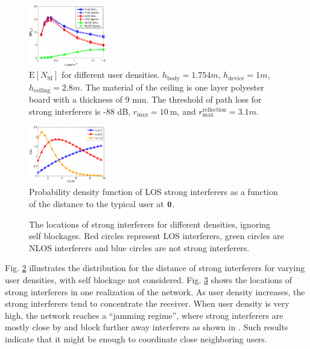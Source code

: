 \documentclass[10pt, conference, letterpaper]{IEEEtran}
\begin{document}
\begin{figure}
	\centering
	\includegraphics[width = 0.3\textwidth]{Channel_en_si.pdf}
	\caption{$\mathrm{E}[N_{\mathrm{SI}}]$ for different user densities. $h_{\mathrm{body}} = 1.754m$,  $h_{\mathrm{device}}= 1m$, $h_{\mathrm{ceiling}}=2.8m$. 
		The material of the ceiling is one layer polyester board with a thickness of 9 mm. 
		The threshold of path loss for strong interferers is -88 dB, $r_{\max} = 10\mathrm{~m}$, and $r_{\max}^{\mathrm{reflection}} = 3.1m$.}
	\label{fig:channel:en_si}
\end{figure}


\begin{figure}
	\centering
	\includegraphics[width = 0.3\textwidth]{Channel_si_pdf.pdf}
	\caption{Probability density function of LOS strong interferers as a function of the distance to the typical user at $\bf{0}$.}
	\label{fig:Channel_si_pdf}
\end{figure}

\begin{figure}[htp]
	\centering
	 \hfill
	 \hfill
	\label{fig:channel:variation}
	\caption{The locations of strong interferers for different densities, ignoring self blockages. Red circles represent LOS interferers, green circles are NLOS interferers and blue circles are not strong interferers.}
\end{figure}

Fig. \ref{fig:Channel_si_pdf} illustrates the distribution for the distance of strong interferers for varying user densities, with self blockage not considered. Fig. \ref{fig:channel:variation} shows the locations of strong interferers in one realization of the network.
As user density increases, the strong interferers tend to concentrate the receiver. When user density is very high, the network reaches a ``jamming regime'', where strong interferers are mostly close by and block further away interferers as shown in .
Such results indicate that it might be enough to coordinate close neighboring users.
\end{document}

